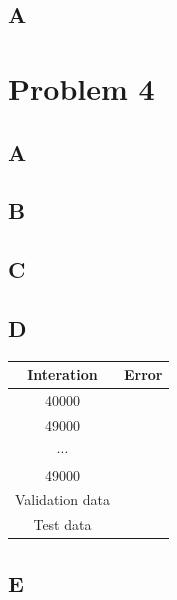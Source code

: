 \documentclass{article}
\begin{document}
        \subsection{A}
    \section{Problem 4}
        \subsection{A}
        \subsection{B}
        \subsection{C}
        \subsection{D}
            \begin{tabular}{|c|c|}
                \hline
                Interation & Error \\
                \hline
                40000 & \\
                \hline
                49000 & \\
                \hline
                $\cdots$ & \\
                \hline
                49000 & \\
                \hline
                Validation data & \\
                \hline
                Test data & \\
                \hline
            \end{tabular}
        \subsection{E}
\end{document}
